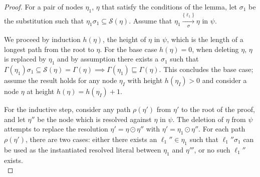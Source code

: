 \documentclass{llncs}
\begin{document}
\begin{proof}
For a pair of nodes $\eta_1$, $\eta$ that satisfy the conditions of the lemma, let $\sigma_1$ be the substitution such that $\eta_1\sigma_1 \subseteq \mathcal{S}(\eta)$. Assume that $\eta_1 \xrightarrow[\sigma]{\{\ell_1\} } \eta$ in $\psi$.

We proceed by induction $h(\eta)$, the height of $\eta$ in $\psi$, which is the length of a longest path from the root to $\eta$. For the base case $h(\eta)=0$, when deleting $\eta$, $\eta$ is replaced by $\eta_1$ and by assumption there exists a $\sigma_1$ such that $\Gamma(\eta_1)\sigma_1 \subseteq \mathcal{S}(\eta) = \Gamma(\eta) \implies \Gamma(\eta_1) \sqsubseteq \Gamma(\eta)$. This concludes the base case; assume the result holds for any node $\eta_I$ with height $h(\eta_I) > 0$ and consider a node $\eta$ at height $h(\eta)=h(\eta_I)+1$.

For the inductive step, %
consider any path $\rho(\eta')$ from $\eta'$ to the root of the proof, and let $\eta''$ be the node which is resolved against $\eta$ in $\psi$. The deletion of $\eta$ from $\psi$ attempts to replace the resolution $\eta'=\eta \odot \eta''$ with $\eta' = \eta_1 \odot \eta''$.
For each path $\rho(\eta')$, there are two cases: either there exists an $\ell_1''\in \eta_1$ such that $\ell_1''\sigma_1$ can be used as the instantiated resolved literal between $\eta_1$ and $\eta'''$, or no such $\ell_1''$ exists.\\


\end{proof}
\end{document}
